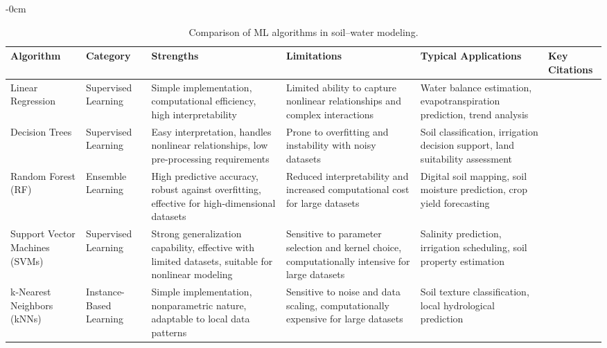 \documentclass[land,review,accept,pdftex,oneauthor]{Definitions/mdpi}
\begin{document}
\begin{table}[H] 
\caption{Comparison of ML algorithms in soil--water modeling.}
\label{tab:ml_algorithms} 

\footnotesize
\begin{adjustwidth}{-\extralength}{0cm}
\begin{minipage}{\fulllength}
\begin{tabularx}{\textwidth}{m{2.4cm}<{\raggedright}m{2cm}<{\raggedright}m{3.2cm}<{\raggedright}m{3.2cm}<{\raggedright}m{3.2cm}<{\raggedright}m{1.8cm}<{\raggedright}}
\toprule
Algorithm &
Category &
Strengths &
Limitations &
Typical Applications &
Key Citations \\
\midrule

Linear Regression &
Supervised Learning &
Simple implementation, computational efficiency, high interpretability &
Limited ability to capture nonlinear relationships and complex interactions &
Water balance estimation, evapotranspiration prediction, trend analysis &
\citep{Montgomery2021,Allen1998,Gaoetal2017,Konukcu,SCOTT2021108251} \\
\midrule

Decision Trees &
Supervised Learning &
Easy interpretation, handles nonlinear relationships, low pre-processing requirements &
Prone to overfitting and instability with noisy datasets &
Soil classification, irrigation decision support, land suitability assessment &
\citep{Quinlan1986,Safavian1991,Padarian2020} \\ 
\midrule

Random Forest (RF) &
Ensemble Learning &
High predictive accuracy, robust against overfitting, effective for high-dimensional datasets &
Reduced interpretability and increased computational cost for large datasets &
Digital soil mapping, soil moisture prediction, crop yield forecasting &
\citep{Breiman2001,Hengl2017,Carranza2021,Liaw2002,Biau2016} \\ 
\midrule

Support Vector Machines (SVMs) &
Supervised Learning &
Strong generalization capability, effective with limited datasets, suitable for nonlinear modeling &
Sensitive to parameter selection and kernel choice, computationally intensive for large datasets &
Salinity prediction, irrigation scheduling, soil property estimation &
\citep{Gill2006,Asefa,Behzad,Karandish2016} \\ 
\midrule

k-Nearest Neighbors (kNNs) &
Instance-Based Learning &
Simple implementation, nonparametric nature, adaptable to local data patterns &
Sensitive to noise and data scaling, computationally expensive for large datasets &
Soil texture classification, local hydrological prediction &
\citep{Cover1967,Altman1992,VELOSO2022e00569,Elshorbagy2010,Fix1989} \\
\midrule


\end{tabularx}
\end{minipage}
\end{adjustwidth}
\end{table}
\end{document}
